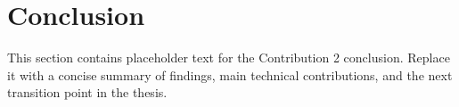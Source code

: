 \section{Conclusion}
\label{sec::contrib2::conclusion}

This section contains placeholder text for the Contribution 2 conclusion. Replace it with a concise summary of findings, main technical contributions, and the next transition point in the thesis.
